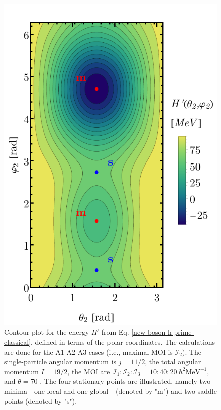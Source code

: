 \begin{figure}
    \begin{center}
        \includegraphics[scale=0.7]{Chapters/Figures/New-Boson-Classical-H-2axis-quantization.pdf}
        \caption{Contour plot for the energy $H'$ from Eq. \ref{new-boson-h-prime-classical}, defined in terms of the polar coordinates. The calculations are done for the A1-A2-A3 cases (i.e., maximal MOI is $\mathcal{I}_2)$. The single-particle angular momentum is $j=11/2$, the total angular momentum $I=19/2$, the MOI are $\mathcal{I}_1:\mathcal{I}_2:\mathcal{I}_3=10:40:20\ \hbar^2\text{MeV}^{-1}$, and $\theta=70^\circ$. The four stationary points are illustrated, namely two minima - one local and one global - (denoted by "m") and two saddle points (denoted by "s").}
        \label{new-boson-hprime-2axis-contour-plot}
    \end{center}
\end{figure}
